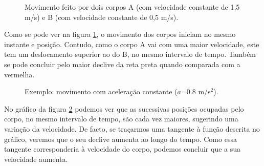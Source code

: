 \documentclass[a4paper,12pt]{article}
\begin{document}
	\begin{figure}[H]
		\centering
		\caption{Movimento feito por dois corpos A (com velocidade constante de 1,5 m/s) e B (com velocidade constante de 0,5 m/s).}
		\label{fig:graf-pos}
	\end{figure}
	
	Como se pode ver na figura \ref{fig:graf-pos}, o movimento dos corpos iniciam no mesmo instante e posição. Contudo, como o corpo A vai com uma maior velocidade, este tem um deslocamento superior ao do B, no mesmo intervalo de tempo. Também se pode concluir pelo maior declive da reta preta quando comparada com a vermelha.
	
	\begin{figure}[H]
		\centering
		\caption{Exemplo: movimento com aceleração constante ($a$=0.8 m/s$^2$).}
		\label{fig:graf-pos-acel}
	\end{figure}
	
	No gráfico da figura \ref{fig:graf-pos-acel} podemos ver que as sucessivas posições ocupadas pelo corpo, no mesmo intervalo de tempo, são cada vez maiores, sugerindo uma variação da velocidade. De facto, se traçarmos uma tangente à função descrita no gráfico, veremos que o seu declive aumenta ao longo do tempo. Como essa tangente corresponderia à velocidade do corpo, podemos concluir que a sua velocidade aumenta.
	
\end{document}
